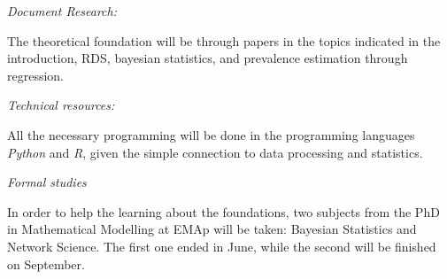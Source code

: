 {\em Document Research:}

The theoretical foundation will be through papers in the topics indicated in
the introduction, RDS, bayesian statistics, and prevalence estimation through
regression. 

{\em Technical resources:}

All the necessary programming will be done in the programming languages
\textit{Python} and \textit{R}, given the simple connection to data processing
and
statistics. 

{\em Formal studies}

In order to help the learning about the foundations, two subjects from the
PhD in Mathematical Modelling at EMAp will be taken: Bayesian Statistics and
Network Science. The first one ended in June, while the second will be
finished on September.  